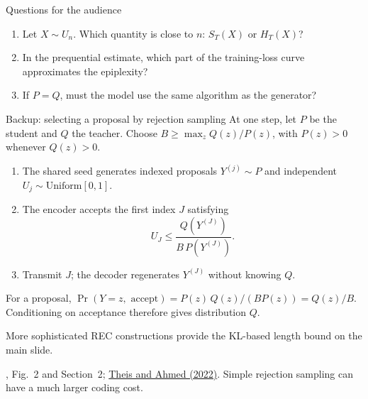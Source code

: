 \documentclass[aspectratio=169,notheorems]{beamer}
\theoremstyle{definition}
\newcommand{\src}[1]{{\scriptsize\color{black!60}#1\par}}
\begin{document}
\begin{frame}{Questions for the audience}
\small
\begin{enumerate}\setlength{\itemsep}{0.7em}
\item Let $X\sim U_n$. Which quantity is close to $n$: $S_T(X)$ or $H_T(X)$?
\item In the prequential estimate, which part of the training-loss curve approximates the epiplexity?
\item If $P=Q$, must the model use the same algorithm as the generator?
\end{enumerate}
\end{frame}
\begin{frame}{Backup: selecting a proposal by rejection sampling}
\small
At one step, let $P$ be the student and $Q$ the teacher. Choose $B\ge\max_z Q(z)/P(z)$, with $P(z)>0$ whenever $Q(z)>0$.
\begin{enumerate}\setlength{\itemsep}{0.5em}
\item The shared seed generates indexed proposals $Y^{(j)}\sim P$ and independent $U_j\sim\mathrm{Uniform}[0,1]$.
\item The encoder accepts the first index $J$ satisfying
\[
U_J\le\frac{Q(Y^{(J)})}{B\,P(Y^{(J)})}.
\]
\item Transmit $J$; the decoder regenerates $Y^{(J)}$ without knowing $Q$.
\end{enumerate}
For a proposal, $\Pr(Y=z,\text{ accept})=P(z)\,Q(z)/(BP(z))=Q(z)/B$. Conditioning on acceptance therefore gives distribution $Q$.

\medskip
More sophisticated REC constructions provide the KL-based length bound on the main slide.
\par\smallskip
\src{\citet{qiu2026}, Fig.~2 and Section~2; \href{https://proceedings.mlr.press/v162/theis22a.html}{Theis and Ahmed (2022)}. Simple rejection sampling can have a much larger coding cost.}
\end{frame}
\end{document}
